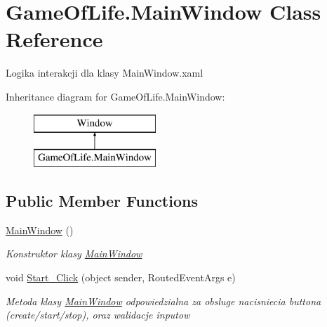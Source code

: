 \hypertarget{class_game_of_life_1_1_main_window}{}\section{Game\+Of\+Life.\+Main\+Window Class Reference}
\label{class_game_of_life_1_1_main_window}


Logika interakcji dla klasy Main\+Window.\+xaml  


Inheritance diagram for Game\+Of\+Life.\+Main\+Window\+:\begin{figure}[H]
\begin{center}
\leavevmode
\includegraphics[height=2.000000cm]{class_game_of_life_1_1_main_window}
\end{center}
\end{figure}
\subsection*{Public Member Functions}
\begin{DoxyCompactItemize}
\item 
\mbox{\hyperlink{class_game_of_life_1_1_main_window_a20edd6a1a783f5298ba41a0f79411d66}{Main\+Window}} ()
\begin{DoxyCompactList}\small\item\em Konstruktor klasy \mbox{\hyperlink{class_game_of_life_1_1_main_window}{Main\+Window}} \end{DoxyCompactList}\item 
void \mbox{\hyperlink{class_game_of_life_1_1_main_window_af30e42841457231f265f246c8e6ecdb9}{Start\+\_\+\+Click}} (object sender, Routed\+Event\+Args e)
\begin{DoxyCompactList}\small\item\em Metoda klasy \mbox{\hyperlink{class_game_of_life_1_1_main_window}{Main\+Window}} odpowiedzialna za obsluge nacisniecia buttona (create/start/stop), oraz walidacje inputow \end{DoxyCompactList}\end{DoxyCompactItemize}
